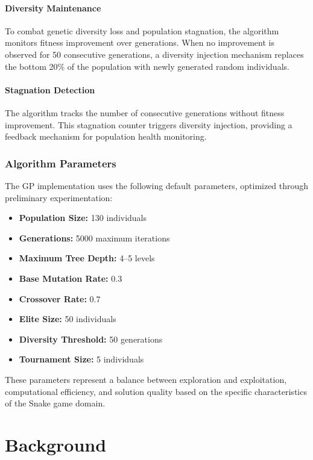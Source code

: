 \documentclass[a4paper,12pt]{article}
\begin{document}
\paragraph{Diversity Maintenance} To combat genetic diversity loss and population stagnation, the algorithm monitors fitness improvement over generations. When no improvement is observed for 50 consecutive generations, a diversity injection mechanism replaces the bottom 20\% of the population with newly generated random individuals.

\paragraph{Stagnation Detection} The algorithm tracks the number of consecutive generations without fitness improvement. This stagnation counter triggers diversity injection, providing a feedback mechanism for population health monitoring.

\subsubsection{Algorithm Parameters}

The GP implementation uses the following default parameters, optimized through preliminary experimentation:
\begin{itemize}
   \item \textbf{Population Size:} 130 individuals
   \item \textbf{Generations:} 5000 maximum iterations
   \item \textbf{Maximum Tree Depth:} 4–5 levels
   \item \textbf{Base Mutation Rate:} 0.3
   \item \textbf{Crossover Rate:} 0.7
   \item \textbf{Elite Size:} 50 individuals
   \item \textbf{Diversity Threshold:} 50 generations
   \item \textbf{Tournament Size:} 5 individuals
\end{itemize}

These parameters represent a balance between exploration and exploitation, computational efficiency, and solution quality based on the specific characteristics of the Snake game domain.

\section{Background}
\end{document}
